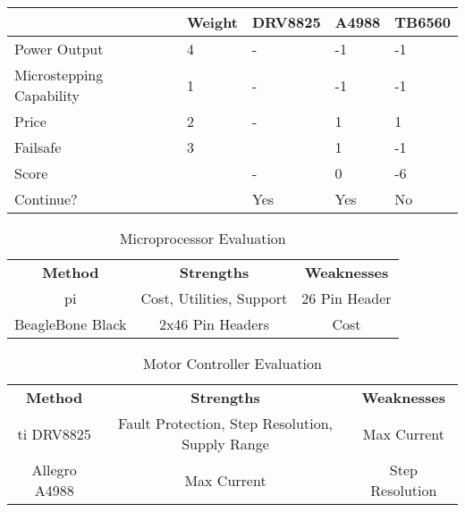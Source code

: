 \begin{table}[h]
\begin{tabular}{|l|l|l|l|l|}
\hline
                         & Weight & DRV8825 & A4988 & TB6560 \\ \hline
Power Output             & 4      & -       & -1    & -1     \\ \hline
Microstepping Capability & 1      & -       & -1    & -1     \\ \hline
Price                    & 2      & -       & 1     & 1      \\ \hline
Failsafe                 & 3      &         & 1     & -1     \\ \hline
Score                    &        & -       & 0     & -6     \\ \hline
Continue?                &        & Yes     & Yes   & No     \\ \hline
\end{tabular}
\end{table}

\begin{table}[ht]
	\caption{Microprocessor Evaluation}
	\label{table:uPEval}
	\centering
	\begin{tabular}{|c c c|} 
		\hline\hline
		\textbf{Method} & \textbf{Strengths} & \textbf{Weaknesses}\\
		\gls{pi} & Cost, Utilities, Support & 26 Pin Header\\
		BeagleBone Black & 2x46 Pin Headers & Cost \\
	\hline 
	\end{tabular}
\end{table}

\begin{table}[ht]
	\caption{Motor Controller Evaluation}
	\label{table:MCEval}
	\centering
	\begin{tabular}{|c c c|} 
		\hline\hline
		\textbf{Method} & \textbf{Strengths} & \textbf{Weaknesses}\\
		\gls{ti} DRV8825 & Fault Protection, Step Resolution, Supply Range & Max Current\\
		Allegro A4988 & Max Current & Step Resolution\\
		\hline
	\end{tabular}
\end{table}
